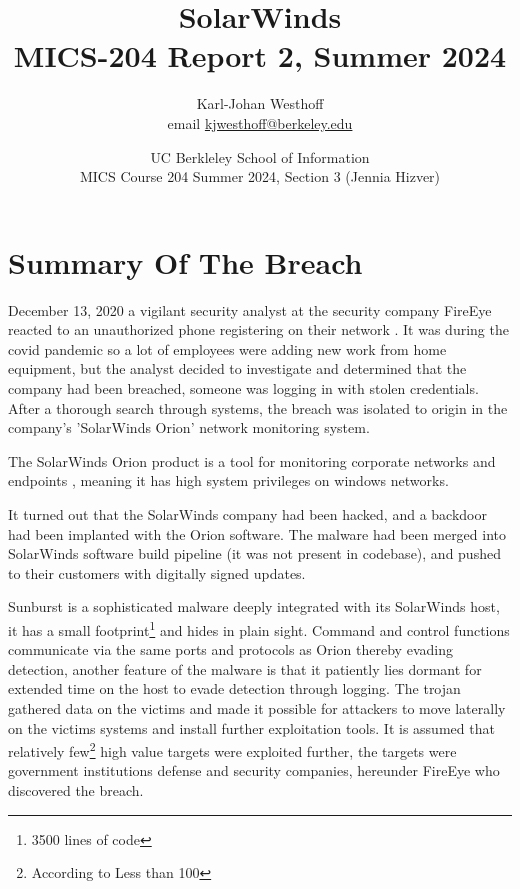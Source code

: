 \documentclass[
	letterpaper, %
	10pt, %
	unnumberedsections, %
	twoside, %
]{LTJournalArticle}
\title{SolarWinds \\ MICS-204 Report 2,  Summer 2024} %
\author{
	Karl-Johan Westhoff \\
	email \href{mailto:kjwesthoff@berkeley.edu}{kjwesthoff@berkeley.edu}
}
\date{UC Berkleley School of Information \\
MICS Course 204 Summer 2024, Section 3 (Jennia Hizver)
}
\begin{document}
\maketitle %


\section{Summary Of The Breach}
December 13, 2020 a vigilant security analyst at the security company FireEye reacted to an unauthorized phone registering on their network \cite{CNN_FireEye}. It was during the covid pandemic so a lot of employees were adding new work from home equipment, but the analyst decided to investigate and determined that the company had been breached, someone was logging in with stolen credentials. After a thorough search through systems, the breach was isolated to origin in the company's 'SolarWinds Orion' network monitoring system.\par The SolarWinds Orion product is a tool for monitoring corporate networks and endpoints \cite{SolarWindsOrion}, meaning it has high system privileges on windows networks. \par
It turned out that the SolarWinds company had been hacked, and a backdoor had been implanted with the Orion software. The malware had been merged into SolarWinds software build pipeline (it was not present in codebase), and pushed to their customers with digitally signed updates. \par
Sunburst is a sophisticated malware deeply integrated with its SolarWinds host, it has a small footprint\footnote{3500 lines of code} and hides in plain sight. Command and control functions communicate via the same ports and protocols as Orion thereby evading detection, another feature of the malware is that it patiently lies dormant for extended time on the host to evade detection through logging. The trojan gathered data on the victims and made it possible for attackers to move laterally on the victims systems and install further exploitation tools. It is assumed that relatively few\footnote{According to \cite{SolarWindsCISO} Less than 100} high value targets were exploited further, the targets were government institutions defense and security companies, hereunder FireEye who discovered the breach.
\end{document}
